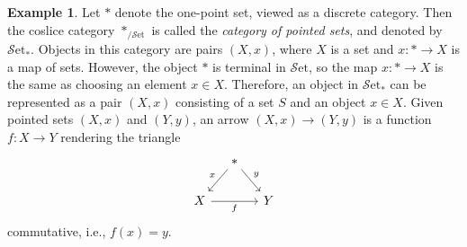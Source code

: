 \documentclass[10pt,oneside]{book}
\def\~#1{\mathscr{#1}}
\def\To#1{\xrightarrow{#1}}
\newcommand{\Set}{\~S\mathrm{et}}
\theoremstyle{plain}
\theoremstyle{definition}
\newtheorem{defn}[thm]{Definition}
\newtheorem{ex}[thm]{Example}
\theoremstyle{remark}
\numberwithin{equation}{section}
\numberwithin{figure}{section}
\begin{document}



\begin{ex}
    Let $\ast$ denote the one-point set, viewed as a discrete category. Then the coslice category $\ast_{/\Set}$ is called the \emph{category of pointed sets}, and denoted by $\Set_\ast$. Objects in this category are pairs $(X, x)$, where $X$ is a set and $x: \ast \to X$ is a map of sets. However, the object $\ast$ is terminal in $\Set$, so the map $x : \ast \to X$ is the same as choosing an element $x \in X$. Therefore, an object in $\Set_\ast$ can be represented as a pair $(X, x)$ consisting of a set $S$ and an object $x \in X$. Given pointed sets $(X, x)$ and $(Y, y)$, an arrow $(X, x) \to (Y, y)$ is a function $f: X \to Y$ rendering the triangle
    \[\begin{tikzcd}[column sep=small]
        & \ast \arrow[dl, "x", swap] \arrow[dr, "y"] & \\
        X \arrow[rr, "f", swap] & & Y
    \end{tikzcd}\] 
    commutative, i.e., $f(x) = y$.
\end{ex}
\end{document}
